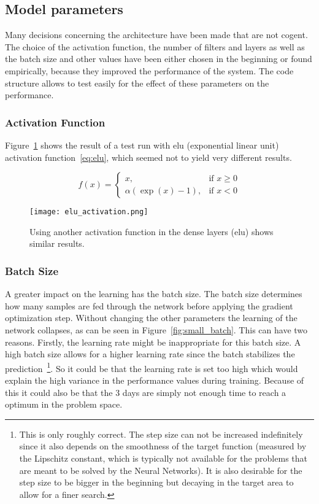 \documentclass[main.tex]{subfiles}
\begin{document}
\subsection{Model parameters}
Many decisions concerning the architecture have been made that are not cogent. The choice of the activation function, the number of filters and layers as well as the batch size and other values have been either chosen in the beginning or found empirically, because they improved the performance of the system. The code structure allows to test easily for the effect of these parameters on the performance. 

\subsubsection{Activation Function}

Figure~\ref{fig:other_act} shows the result of a test run with elu (exponential linear unit) activation function~\ref{eq:elu}, which seemed not to yield very different results.

\begin{equation} \label{eq:elu}
f(x)= \begin{cases}
    x,& \text{if } x\geq 0\\
    \alpha\left(\exp(x) - 1\right), & \text{if } x < 0
    \end{cases}
\end{equation}

\begin{figure}
\begin{center}
\texttt{[image: elu\_activation.png]}
\end{center}
\caption{Using another activation function in the dense layers (elu) shows similar results.}
\label{fig:other_act}
\end{figure}

\subsubsection{Batch Size}

A greater impact on the learning has the batch size. The batch size determines how many samples are fed through the network before applying the gradient optimization step. Without changing the other parameters the learning of the network collapses, as can be seen in Figure~\ref{fig:small_batch}. This can have two reasons. Firstly, the learning rate might be inappropriate for this batch size. A high batch size allows for a higher learning rate since the batch stabilizes the prediction~\footnote{This is only roughly correct. The step size can not be increased indefinitely since it also depends on the smoothness of the target function (measured by the Lipschitz constant, which is typically not available for the problems that are meant to be solved by the Neural Networks). It is also desirable for the step size to be bigger in the beginning but decaying in the target area to allow for a finer search.}. So it could be that the learning rate is set too high which would explain the high variance in the performance values during training. Because of this it could also be that the 3 days are simply not enough time to reach a optimum in the problem space.
\end{document}
